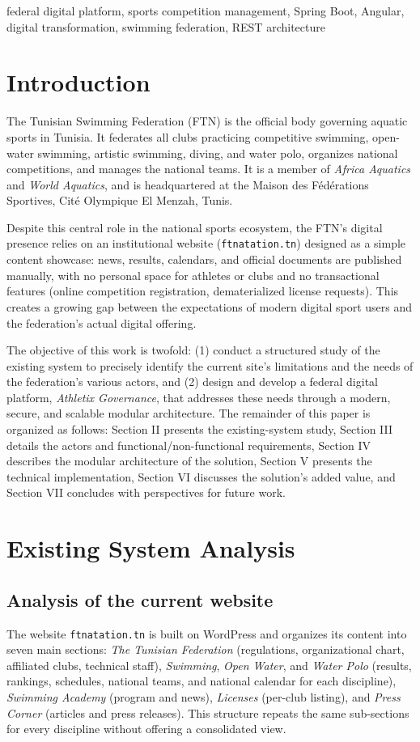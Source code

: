 \documentclass[conference]{IEEEtran}
\begin{document}
\begin{IEEEkeywords}
federal digital platform, sports competition management, Spring Boot, Angular, digital transformation, swimming federation, REST architecture
\end{IEEEkeywords}

\section{Introduction}
The Tunisian Swimming Federation (FTN) is the official body governing aquatic sports in Tunisia. It federates all clubs practicing competitive swimming, open-water swimming, artistic swimming, diving, and water polo, organizes national competitions, and manages the national teams. It is a member of \emph{Africa Aquatics} and \emph{World Aquatics}, and is headquartered at the Maison des Fédérations Sportives, Cité Olympique El Menzah, Tunis.

Despite this central role in the national sports ecosystem, the FTN's digital presence relies on an institutional website (\texttt{ftnatation.tn}) designed as a simple content showcase: news, results, calendars, and official documents are published manually, with no personal space for athletes or clubs and no transactional features (online competition registration, dematerialized license requests). This creates a growing gap between the expectations of modern digital sport users and the federation's actual digital offering.

The objective of this work is twofold: (1) conduct a structured study of the existing system to precisely identify the current site's limitations and the needs of the federation's various actors, and (2) design and develop a federal digital platform, \emph{Athletix Governance}, that addresses these needs through a modern, secure, and scalable modular architecture. The remainder of this paper is organized as follows: Section II presents the existing-system study, Section III details the actors and functional/non-functional requirements, Section IV describes the modular architecture of the solution, Section V presents the technical implementation, Section VI discusses the solution's added value, and Section VII concludes with perspectives for future work.

\section{Existing System Analysis}
\subsection{Analysis of the current website}
The website \texttt{ftnatation.tn} is built on WordPress and organizes its content into seven main sections: \emph{The Tunisian Federation} (regulations, organizational chart, affiliated clubs, technical staff), \emph{Swimming}, \emph{Open Water}, and \emph{Water Polo} (results, rankings, schedules, national teams, and national calendar for each discipline), \emph{Swimming Academy} (program and news), \emph{Licenses} (per-club listing), and \emph{Press Corner} (articles and press releases). This structure repeats the same sub-sections for every discipline without offering a consolidated view.
\end{document}
